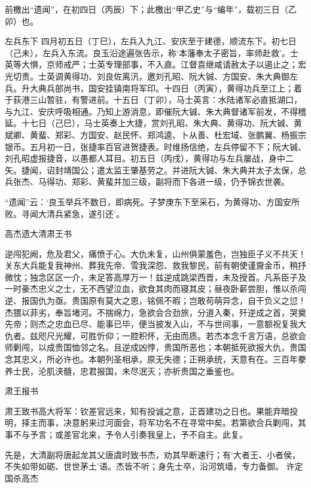 \documentclass[]{article}
\begin{document}
前檄出``遗闻''，在初四日（丙辰）下；此檄出``甲乙史''与``编年''，载初三日（乙卯）也。

左兵东下
四月初五日（丁巳），左兵入九江、安庆至于建德，顺流东下。初七日（己未），左兵入东流。良玉沿途遍张告示，称`本藩奉太子密旨，率师赴救'。士英等大惧，京师戒严；士英专理部事，不入直。江督袁继咸请赦太子以遏止之；宏光切责。士英调黄得功、刘良佐离汛，邀刘孔昭、阮大铖、方国安、朱大典御左兵。升大典兵部尚书，国安挂镇南将军印。十四日（丙寅），黄得功兵至江上；着于荻港三山暂驻，有警进前。十五日（丁卯），马士英言：水陆诸军必直抵湖口，与九江、安庆呼吸相通。乃知上游消息，即催阮大铖、朱大典督诸军前发，不得稽延。十七日（己巳），马士英奏上大捷，赏刘孔昭、朱大典、黄得功、阮大铖、黄斌卿、黄蜚、郑彩、方国安、赵民怀、郑鸿逵、卜从善、杜宏域、张鹏翼、杨振宗银币。五月初一日，张捷率百官进贺捷表。时维扬信绝，左兵停留不下；阮大铖、刘孔昭虚报捷音，以愚都人耳目。初五日（丙戌），黄得功与左兵屡战，身中二矢。捷闻，诏封靖国公；遣太监王肇基劳之。并进阮大铖、朱大典并太子太保，总兵张杰、马得功、郑彩、黄蜚并加三级，副将而下各进一级，仍予锦衣世袭。

``遗闻''云：`良玉举兵不数日，即病死。子梦庚东下至采石，为黄得功、方国安所败。寻闻大清兵紧急，遂引还'。

高杰遗大清肃王书

逆闯犯阙，危及君父，痛愤于心。大仇未复，山州俱蒙羞色，岂独臣子义不共天！关东大兵能复我神州、葬我先帝、雪我深怨、救我黎民，前有朝使谨齎金币，稍抒微忱；独念区区一介，未足答高厚万一！兹逆成跳梁西晋，未及授首。凡系臣子及一时豪杰忠义之士，无不西望泣血，欲食其肉而寝其皮；昼夜卧薪尝胆，惟以杀闯逆、报国仇为亟。贵国原有莫大之恩，铭佩不暇；岂敢苟萌异念，自干负义之愆！
杰猥以菲劣，奉旨堵河。不揣绵力，急欲会合劲旅，分道入秦，歼逆成之首，哭奠先帝；则杰之忠血已尽、能事已毕，便当披发入山，不与世间事，一意额祝复我大仇者。兹咫尺光耀，可胜忻仰；一腔积怀，无由而质。若杰本念千言万语，总欲会师剿闯，以成贵国恤邻之名。且逆成凶悖，贵国所恶也；本朝抵死欲报大仇，贵国念其忠义，所必许也。本朝列圣相承，原无失德；正朔承统，天意有在。三百年豢养士民，沦肌浃髓，忠君报国，未尽泯灭；亦祈贵国之垂鉴也。

肃王报书

肃王致书高大将军：钦差官远来，知有投诚之意，正首建功之日也。果能弃暗投明，择主而事，决意躬来过河面会，将军功名不在寻常中矣。若第欲合兵剿闯，其事不与予言；或差官北来，予令人引奏我皇上，予不自主。此复。

先是，大清副将唐起龙其父唐虞时致书杰，劝其早断速行；有`大者王、小者侯，不失如带如砺、世世茅土'语。杰皆不听；身先士卒，沿河筑墙，专力备御。
许定国杀高杰
\end{document}
